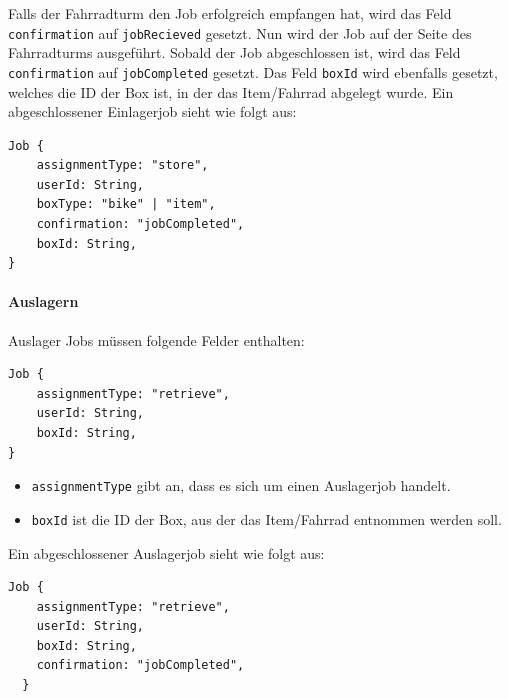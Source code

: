 Falls der Fahrradturm den Job erfolgreich empfangen hat, wird das Feld \texttt{confirmation} auf \texttt{jobRecieved} gesetzt. Nun wird der Job auf der Seite des Fahrradturms ausgeführt. Sobald der Job abgeschlossen ist, wird das Feld \texttt{confirmation} auf \texttt{jobCompleted} gesetzt. Das Feld \texttt{boxId} wird ebenfalls gesetzt, welches die ID der Box ist, in der das Item/Fahrrad abgelegt wurde. Ein abgeschlossener Einlagerjob sieht wie folgt aus:

\begin{verbatim}
Job {
    assignmentType: "store",
    userId: String,
    boxType: "bike" | "item",
    confirmation: "jobCompleted",
    boxId: String,
}
\end{verbatim}

\paragraph{Auslagern}

Auslager Jobs müssen folgende Felder enthalten:

\begin{verbatim}
Job {
    assignmentType: "retrieve",
    userId: String,
    boxId: String,
}
\end{verbatim}

\begin{itemize}
  \item \texttt{assignmentType} gibt an, dass es sich um einen Auslagerjob handelt.
  \item \texttt{boxId} ist die ID der Box, aus der das Item/Fahrrad entnommen werden soll.
\end{itemize}

Ein abgeschlossener Auslagerjob sieht wie folgt aus:

\begin{verbatim}
Job {
    assignmentType: "retrieve",
    userId: String,
    boxId: String,
    confirmation: "jobCompleted",
  }
\end{verbatim}